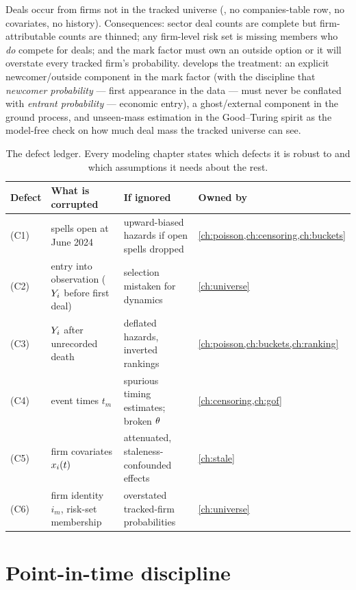 Deals occur from firms not in the tracked universe
(, no companies-table row, no
covariates, no history). Consequences: sector deal counts are complete but
firm-attributable counts are thinned; any firm-level risk set is missing
members who \emph{do} compete for deals; and the mark factor must own an
outside option or it will overstate every tracked firm's probability.
 develops the treatment: an explicit newcomer/outside
component in the mark factor (with the discipline that \emph{newcomer
probability} --- first appearance in the data --- must never be conflated
with \emph{entrant probability} --- economic entry), a ghost/external
component in the ground process, and unseen-mass estimation in the
Good--Turing spirit \citep{good1953,galesampson1995} as the model-free
check on how much deal mass the tracked universe can see.

\begin{table}[htbp]
\centering
\small
\begin{tabular}{p{} p{} p{} p{}}
\toprule
\textbf{Defect} & \textbf{What is corrupted} & \textbf{If ignored} &
\textbf{Owned by} \\
\midrule
(C1) & spells open at June 2024 & upward-biased hazards if open spells
dropped & \cref{ch:poisson,ch:censoring,ch:buckets} \\
(C2) & entry into observation ($Y_i$ before first deal) &
selection mistaken for dynamics & \cref{ch:universe} \\
(C3) & $Y_i$ after unrecorded death & deflated hazards, inverted
rankings & \cref{ch:poisson,ch:buckets,ch:ranking} \\
(C4) & event times $t_m$ & spurious timing estimates; broken
$\theta$ & \cref{ch:censoring,ch:gof} \\
(C5) & firm covariates $x_i(t)$ & attenuated, staleness-confounded
effects & \cref{ch:stale} \\
(C6) & firm identity $i_m$, risk-set membership & overstated tracked-firm
probabilities & \cref{ch:universe} \\
\bottomrule
\end{tabular}
\caption{The defect ledger. Every modeling chapter states which defects it
is robust to and which assumptions it needs about the rest.}
\label{tab:ch02:defects}
\end{table}

\section{Point-in-time discipline}\label{ch02:sec:pit}

